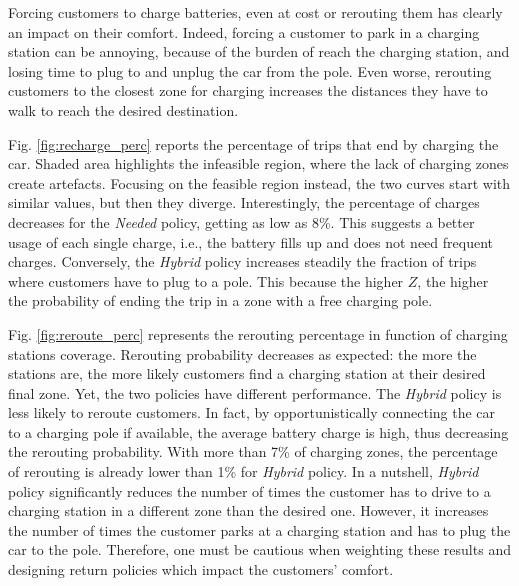 Forcing customers to charge batteries, even at cost or rerouting them has clearly an impact on their comfort. Indeed, forcing a customer to park in a charging station can be annoying, because of the burden of reach the charging station, and losing time to plug to and unplug the car from the pole. Even worse, rerouting customers to the closest zone for charging increases the distances they have to walk to reach the desired destination. 

Fig. \ref{fig:recharge_perc} reports the percentage of trips that end by charging the car. Shaded area highlights the infeasible region, where the lack of charging zones create artefacts. Focusing on the feasible region instead, the two curves start with similar values, but then they diverge. Interestingly, the percentage of charges decreases for the \textit{Needed} policy, getting as low as 8\%. This suggests a better usage of each single charge, i.e., the battery fills up and does not need frequent charges. 
Conversely, the \textit{Hybrid} policy increases steadily the fraction of trips where customers have to plug to a pole. This because the higher $Z$, the higher the probability of ending the trip in a zone with a free charging pole.

Fig. \ref{fig:reroute_perc} represents the rerouting percentage in function of charging stations coverage.
Rerouting probability decreases as expected: the more the stations are, the more likely customers find a charging station at their desired final zone. Yet, the two policies have different performance. The \textit{Hybrid} policy is less likely to reroute customers. In fact, by opportunistically connecting the car to a charging pole if available, the average battery charge is high, thus decreasing the rerouting probability. With more than 7\% of charging zones, the percentage of rerouting is already lower than 1\% for \textit{Hybrid} policy.
In a nutshell, \textit{Hybrid} policy significantly reduces the number of times the customer has to drive to a charging station in a different zone than the desired one. However, it increases the number of times the customer parks at a charging station and has to plug the car to the pole. Therefore, one must be cautious when weighting these results and designing return policies which impact the customers' comfort. 

